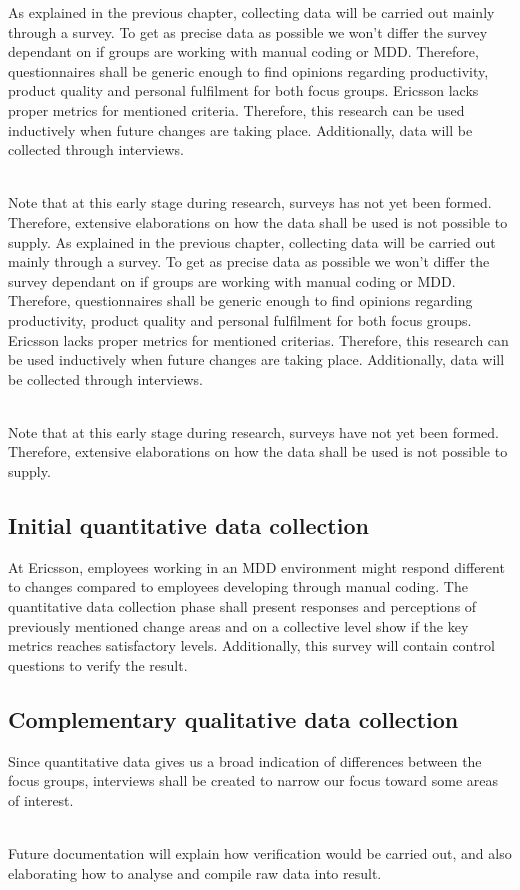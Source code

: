 \documentclass[ProjectPlan_innit.tex]{subfiles}
\begin{document}
As explained in the previous chapter, collecting data will be carried out mainly through a survey. To get as precise data as possible we won't differ the survey dependant on if groups are working with manual coding or MDD. Therefore, questionnaires shall be generic enough to find opinions regarding productivity, product quality and personal fulfilment for both focus groups. Ericsson lacks proper metrics for mentioned criteria. Therefore, this research can be used inductively when future changes are taking place. Additionally, data will be collected through interviews.

\hspace{0pt}\\ Note that at this early stage during research, surveys has not yet been formed. Therefore, extensive elaborations on how the data shall be used is not possible to supply. 
As explained in the previous chapter, collecting data will be carried out mainly through a survey. To get as precise data as possible we won't differ the survey dependant on if groups are working with manual coding or MDD. Therefore, questionnaires shall be generic enough to find opinions regarding productivity, product quality and personal fulfilment for both focus groups. Ericsson lacks proper metrics for mentioned criterias. Therefore, this research can be used inductively when future changes are taking place. Additionally, data will be collected through interviews.

\hspace{0pt}\\ Note that at this early stage during research, surveys have not yet been formed. Therefore, extensive elaborations on how the data shall be used is not possible to supply. 

\subsection{Initial quantitative data collection}
At Ericsson, employees working in an MDD environment might respond different to changes compared to employees developing through manual coding. The quantitative data collection phase shall present responses and perceptions of previously mentioned change areas and on a collective level show if the key metrics reaches satisfactory levels. Additionally, this survey will contain control questions to verify the result.

\subsection{Complementary qualitative data collection}
Since quantitative data gives us a broad indication of differences between the focus groups, interviews shall be created to narrow our focus toward some areas of interest. 

\hspace{0pt}\\ Future documentation will explain how verification would be carried out, and also elaborating how to analyse and compile raw data into result.
\end{document}
